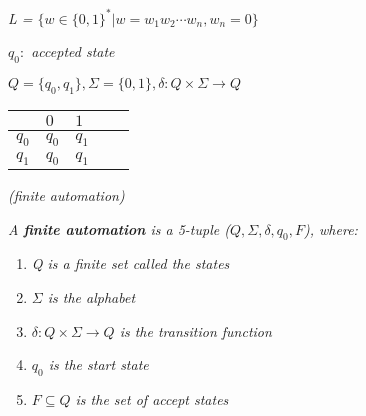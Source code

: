 \documentclass{article}
\begin{document}
\begin{example}
    \textit{L = $\{w\in \{0,1\}^*|w = w_1w_2\cdots w_n,w_n = 0\}$\\}
    \begin{remark}
        \textit{$q_0:$ accepted state}
    \end{remark}
    \textit{$Q = \{q_0,q_1\},\Sigma = \{0,1\},\delta: Q\times \Sigma \rightarrow Q$}
    \begin{table}[htbp]
        \centering
        \begin{tabularx}{\textwidth}{XXXXX}
            \toprule
        $~$ & $0$ & $1$  \\
        \midrule
        $q_0$ & $q_0$ & $q_1$ \\
        $q_1$ & $q_0$ & $q_1$ \\
            \bottomrule
        \end{tabularx}
    \end{table}
\end{example}


\begin{defn}
    \textit{(finite automation)}

    \textit{A \textbf{finite automation} is a 5-tuple ($Q,\Sigma,\delta,q_0,F$), where:}

    \begin{enumerate}
        \item \textit{Q is a finite set called the states}
        \item \textit{$\Sigma$ is the alphabet}
        \item \textit{$\delta:Q\times \Sigma \rightarrow Q$ is the transition function}
        \item \textit{$q_0$ is the start state }
        \item \textit{$F\subseteq Q$ is the set of accept states}
    \end{enumerate}
\end{defn}
\end{document}
